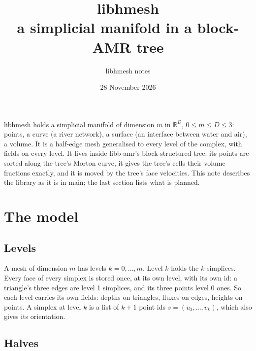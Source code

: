 \documentclass[10pt,a4paper]{article}
\title{libhmesh\\[2pt]
  \large a simplicial manifold in a block-AMR tree}
\author{libhmesh notes}
\date{28 November 2026}
\theoremstyle{definition}
\begin{document}
\maketitle

\noindent
libhmesh holds a simplicial manifold of dimension $m$ in $\mathbb{R}^D$,
$0 \le m \le D \le 3$: points, a curve (a river network), a surface (an
interface between water and air), a volume. It is a half-edge mesh
generalised to every level of the complex, with fields on every level. It
lives inside libb-amr's block-structured tree: its points are sorted along
the tree's Morton curve, it gives the tree's cells their volume fractions
exactly, and it is moved by the tree's face velocities. This note describes
the library as it is in main; the last section lists what is planned.

\tableofcontents

\section{The model}
\label{sec:model}

\subsection{Levels}

A mesh of dimension $m$ has levels $k = 0, \ldots, m$. Level $k$ holds the
$k$-simplices. Every face of every simplex is stored once, at its own
level, with its own id: a triangle's three edges are level 1 simplices, and
its three points level 0 ones. So each level carries its own fields: depths
on triangles, fluxes on edges, heights on points. A simplex at level $k$ is
a list of $k + 1$ point ids $s = (v_0, \ldots, v_k)$, which also gives its
orientation.

\subsection{Halves}
\end{document}

